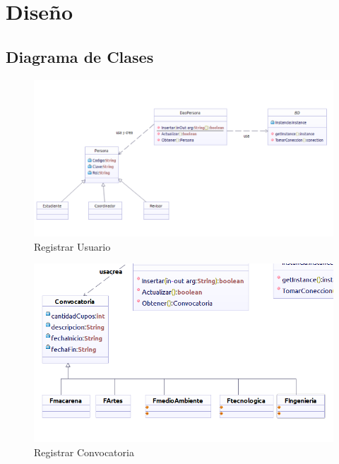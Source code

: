 \chapter{Diseño}





\section{Diagrama de Clases}

\begin{figure}[th!]
	\centering
	\includegraphics[width=1.2\linewidth]{uml/Clases/ClasesCrearUsuario}
	\caption{Registrar Usuario}
	\label{fig:Registrar Usuario}
\end{figure}

\newpage


\begin{figure}[th!]
	\centering
	\includegraphics[width=0.9\linewidth]{uml/Clases/convocatorias}
	\caption{Registrar Convocatoria}
	\label{fig:Registrar Convocatoria}
\end{figure}

